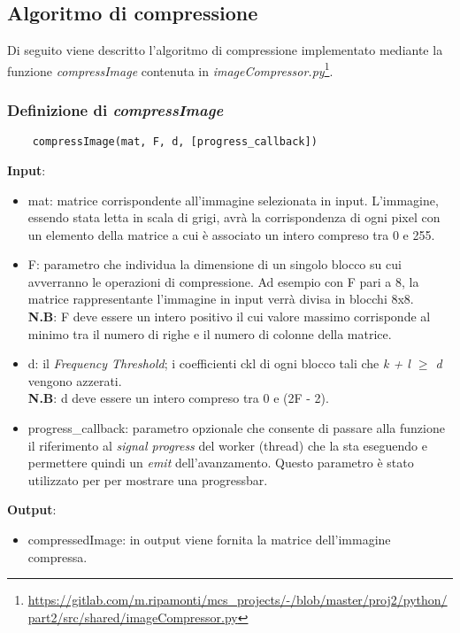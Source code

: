 \subsection{Algoritmo di compressione}\label{algoritmo}
Di seguito viene descritto l'algoritmo di compressione implementato mediante la funzione \emph{compressImage} contenuta in \emph{imageCompressor.py}\footnote{\url{https://gitlab.com/m.ripamonti/mcs_projects/-/blob/master/proj2/python/part2/src/shared/imageCompressor.py}}.

\subsubsection{Definizione di \emph{compressImage}}
\begin{verbatim}
    compressImage(mat, F, d, [progress_callback])
\end{verbatim}
\textbf{Input}:
\begin{itemize}
	\item mat: matrice corrispondente all'immagine selezionata in input. L'immagine, essendo stata letta in scala di grigi, avrà la corrispondenza di ogni pixel con un elemento della matrice a cui è associato un intero compreso tra 0 e 255.
	\item F: parametro che individua la dimensione di un singolo blocco su cui avverranno le operazioni di compressione. Ad esempio con F pari a 8, la matrice rappresentante l'immagine in input verrà divisa in blocchi 8x8.\\ \textbf{N.B}: F deve essere un intero positivo il cui valore massimo corrisponde al minimo tra il numero di righe e il numero di colonne della matrice.
	\item d: il \emph{Frequency Threshold}; i coefficienti ckl di ogni blocco tali che \emph{k + l $\geq$ d} vengono azzerati.\\ \textbf{N.B}: d deve essere un intero compreso tra 0 e (2F - 2).
	\item progress\_callback: parametro opzionale che consente di passare alla funzione il riferimento al \emph{signal progress} del worker (thread) che la sta eseguendo e permettere quindi un \emph{emit} dell'avanzamento. Questo parametro è stato utilizzato per per mostrare una progressbar.
\end{itemize}
\textbf{Output}:
\begin{itemize}
	\item compressedImage: in output viene fornita la matrice dell'immagine compressa.
\end{itemize}

